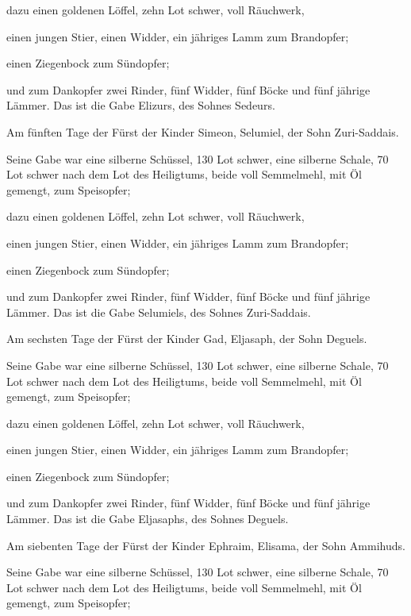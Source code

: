  dazu einen goldenen Löffel, zehn Lot schwer, voll
Räuchwerk,

 einen jungen Stier, einen Widder, ein jähriges Lamm zum
Brandopfer;

 einen Ziegenbock zum Sündopfer;

 und zum Dankopfer zwei Rinder, fünf Widder, fünf Böcke
und fünf jährige Lämmer. Das ist die Gabe Elizurs, des Sohnes Sedeurs.

 Am fünften Tage der Fürst der Kinder Simeon, Selumiel,
der Sohn Zuri-Saddais.

 Seine Gabe war eine silberne Schüssel, 130 Lot schwer,
eine silberne Schale, 70 Lot schwer nach dem Lot des Heiligtums, beide
voll Semmelmehl, mit Öl gemengt, zum Speisopfer;

 dazu einen goldenen Löffel, zehn Lot schwer, voll
Räuchwerk,

 einen jungen Stier, einen Widder, ein jähriges Lamm zum
Brandopfer;

 einen Ziegenbock zum Sündopfer;

 und zum Dankopfer zwei Rinder, fünf Widder, fünf Böcke
und fünf jährige Lämmer. Das ist die Gabe Selumiels, des Sohnes
Zuri-Saddais.

 Am sechsten Tage der Fürst der Kinder Gad, Eljasaph, der
Sohn Deguels.

 Seine Gabe war eine silberne Schüssel, 130 Lot schwer,
eine silberne Schale, 70 Lot schwer nach dem Lot des Heiligtums, beide
voll Semmelmehl, mit Öl gemengt, zum Speisopfer;

 dazu einen goldenen Löffel, zehn Lot schwer, voll
Räuchwerk,

 einen jungen Stier, einen Widder, ein jähriges Lamm zum
Brandopfer;

 einen Ziegenbock zum Sündopfer;

 und zum Dankopfer zwei Rinder, fünf Widder, fünf Böcke
und fünf jährige Lämmer. Das ist die Gabe Eljasaphs, des Sohnes Deguels.

 Am siebenten Tage der Fürst der Kinder Ephraim, Elisama,
der Sohn Ammihuds.

 Seine Gabe war eine silberne Schüssel, 130 Lot schwer,
eine silberne Schale, 70 Lot schwer nach dem Lot des Heiligtums, beide
voll Semmelmehl, mit Öl gemengt, zum Speisopfer;

